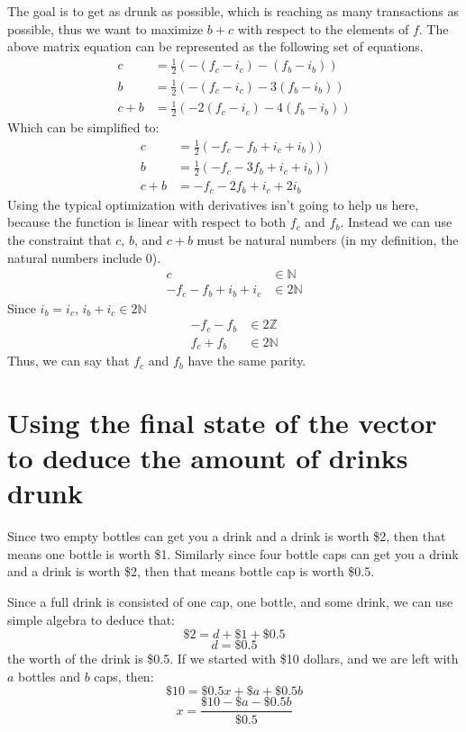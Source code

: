 \documentclass[letterpaper, 12pt]{article}
\begin{document}
The goal is to get as drunk as possible, which is reaching as many transactions as possible, thus we want to maximize $b + c$ with respect to the elements of $f$.
The above matrix equation can be represented as the following set of equations.
\begin{align*}
    c &= \frac{1}{2}(-(f_c - i_c) - (f_b - i_b))\\
    b &= \frac{1}{2}(-(f_c - i_c) - 3(f_b - i_b))\\
    c + b &= \frac{1}{2}(-2(f_c - i_c) - 4(f_b - i_b))
\end{align*}
Which can be simplified to:
\begin{align*}
    c &= \frac{1}{2}(-f_c - f_b  + i_c + i_b))\\
    b &= \frac{1}{2}(-f_c - 3f_b + i_c + i_b))\\
    c + b &= -f_c - 2f_b + i_c + 2i_b
\end{align*}
Using the typical optimization with derivatives isn't going to help us here, because the function is linear with respect to both $f_c$ and $f_b$.
Instead we can use the constraint that $c$, $b$, and $c + b$ must be natural numbers (in my definition, the natural numbers include 0).
\begin{align*}
    c &\in \mathbb{N} \\
    -f_c - f_b + i_b + i_c &\in 2\mathbb{N}
\end{align*}
Since $i_b = i_c$, $i_b + i_c \in 2\mathbb{N}$
\begin{align*}
    -f_c - f_b &\in 2\mathbb{Z}\\
    f_c + f_b &\in 2\mathbb{N}
\end{align*}
Thus, we can say that $f_c$ and $f_b$ have the same parity.
\section{Using the final state of the vector to deduce the amount of drinks drunk}
\par Since two empty bottles can get you a drink and a drink is worth \$2, then that means one bottle is worth \$1.
Similarly since four bottle caps can get you a drink and a drink is worth \$2, then that means bottle cap is worth \$0.5.
\par Since a full drink is consisted of one cap, one bottle, and some drink, we can use simple algebra to deduce that:
\begin{equation}
    \$2 = d + \$1 + \$0.5
\end{equation}
\begin{equation}
    d = \$0.5
\end{equation}
the worth of the drink is \$0.5.
If we started with \$10 dollars, and we are left with $a$ bottles and $b$ caps, then:
\begin{equation}
    \$10 = \$0.5x + \$a + \$0.5b
\end{equation}
\begin{equation}
    x = \frac{\$10 - \$a - \$0.5b}{\$0.5}
\end{equation}
\end{document}

